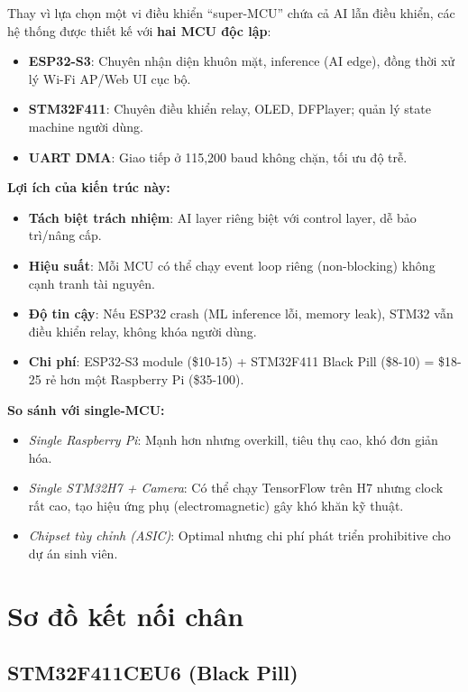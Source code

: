 Thay vì lựa chọn một vi điều khiển ``super-MCU'' chứa cả AI lẫn điều khiển, các hệ thống được thiết kế với \textbf{hai MCU độc lập}:

\begin{itemize}
  \item \textbf{ESP32-S3}: Chuyên nhận diện khuôn mặt, inference (AI edge), đồng thời xử lý Wi-Fi AP/Web UI cục bộ.
  \item \textbf{STM32F411}: Chuyên điều khiển relay, OLED, DFPlayer; quản lý state machine người dùng.
  \item \textbf{UART DMA}: Giao tiếp ở 115,200 baud không chặn, tối ưu độ trễ.
\end{itemize}

\textbf{Lợi ích của kiến trúc này:}
\begin{itemize}
  \item \textbf{Tách biệt trách nhiệm}: AI layer riêng biệt với control layer, dễ bảo trì/nâng cấp.
  \item \textbf{Hiệu suất}: Mỗi MCU có thể chạy event loop riêng (non-blocking) không cạnh tranh tài nguyên.
  \item \textbf{Độ tin cậy}: Nếu ESP32 crash (ML inference lỗi, memory leak), STM32 vẫn điều khiển relay, không khóa người dùng.
  \item \textbf{Chi phí}: ESP32-S3 module (\$10-15) + STM32F411 Black Pill (\$8-10) = \$18-25 rẻ hơn một Raspberry Pi (\$35-100).
\end{itemize}

\textbf{So sánh với single-MCU:}
\begin{itemize}
  \item \textit{Single Raspberry Pi}: Mạnh hơn nhưng overkill, tiêu thụ cao, khó đơn giản hóa.
  \item \textit{Single STM32H7 + Camera}: Có thể chạy TensorFlow trên H7 nhưng clock rất cao, tạo hiệu ứng phụ (electromagnetic) gây khó khăn kỹ thuật.
  \item \textit{Chipset tùy chỉnh (ASIC)}: Optimal nhưng chi phí phát triển prohibitive cho dự án sinh viên.
\end{itemize}

\section{Sơ đồ kết nối chân}
\label{sec:pinout}

\subsection{STM32F411CEU6 (Black Pill)}

